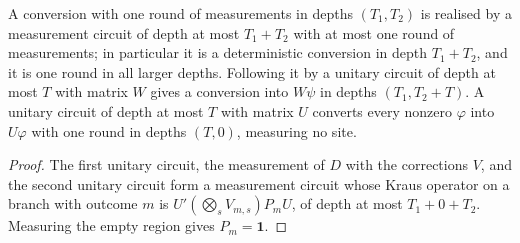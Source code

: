 \begin{lemma}
    \label{lem:measurement_one_round}
    \leanok
    A conversion with one round of measurements in depths $(T_1,T_2)$ is realised by a
    measurement circuit of depth at most $T_1+T_2$ with at most one round of measurements; in
    particular it is a deterministic conversion in depth $T_1+T_2$, and it is one round in all
    larger depths. Following it by a unitary
    circuit of depth at most $T$ with matrix $W$ gives a conversion into $W\psi$ in depths
    $(T_1,T_2+T)$. A unitary circuit of depth at most $T$ with matrix $U$ converts every
    nonzero $\varphi$ into $U\varphi$ with one round in depths $(T,0)$, measuring no site.
\end{lemma}
\begin{proof}
    \leanok
    The first unitary circuit, the measurement of $D$ with the corrections $V$, and the second
    unitary circuit form a measurement circuit whose Kraus operator on a branch with outcome
    $m$ is $U'(\bigotimes_sV_{m,s})P_mU$, of depth at most $T_1+0+T_2$. Measuring the empty
    region gives $P_m=\mathbf{1}$.
\end{proof}






